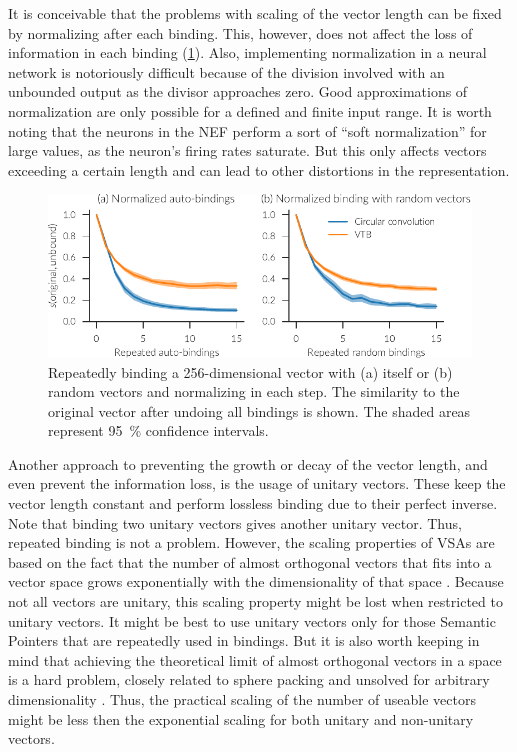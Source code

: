 It is conceivable that the problems with scaling of the vector length can be fixed by normalizing after each binding.
This, however, does not affect the loss of information in each binding (\cref{fig:bindings-normalized}).
Also, implementing normalization in a neural network is notoriously difficult because of the division involved with an unbounded output as the divisor approaches zero.
Good approximations of normalization are only possible for a defined and finite input range.
It is worth noting that the neurons in the NEF perform a sort of ``soft normalization'' for large values, as the neuron's firing rates saturate.
But this only affects vectors exceeding a certain length and can lead to other distortions in the representation.
\begin{figure}
    \centering
    \includegraphics{figures/bindings-normalized}
    \caption[Repeatedly binding a 256-dimensional vector with normalization]{Repeatedly binding a 256-dimensional vector with (a) itself or (b) random vectors and normalizing in each step. The similarity to the original vector after undoing all bindings is shown. The shaded areas represent \SI{95}{\percent} confidence intervals.}\label{fig:bindings-normalized}
\end{figure}

Another approach to preventing the growth or decay of the vector length, and even prevent the information loss, is the usage of unitary vectors.
These keep the vector length constant and perform lossless binding due to their perfect inverse.
Note that binding two unitary vectors gives another unitary vector.
Thus, repeated binding is not a problem.
However, the scaling properties of VSAs are based on the fact that the number of almost orthogonal vectors that fits into a vector space grows exponentially with the dimensionality of that space \parencite{wyner1967,cai2013}.
Because not all vectors are unitary, this scaling property might be lost when restricted to unitary vectors.
It might be best to use unitary vectors only for those Semantic Pointers that are repeatedly used in bindings.
But it is also worth keeping in mind that achieving the theoretical limit of almost orthogonal vectors in a space is a hard problem, closely related to sphere packing and unsolved for arbitrary dimensionality \parencite{cohn2017}.
Thus, the practical scaling of the number of useable vectors might be less then the exponential scaling for both unitary and non-unitary vectors.

